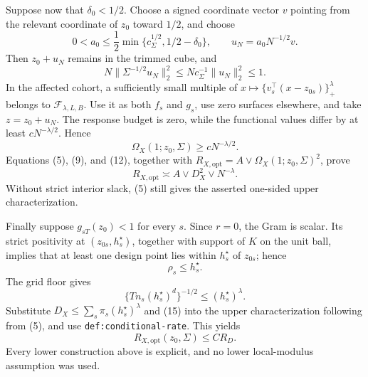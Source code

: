 Suppose now that \(\delta_0<1/2\).  Choose a signed coordinate vector \(v\) pointing from the relevant coordinate of \(z_0\) toward \(1/2\), and choose
\[
 0<a_0\le\frac12\min\{c_\Sigma^{1/2},1/2-\delta_0\},
 \qquad u_N=a_0N^{-1/2}v.                                  \tag{10}
\]
Then \(z_0+u_N\) remains in the trimmed cube, and
\[
 N\|\Sigma^{-1/2}u_N\|_2^2
 \le Nc_\Sigma^{-1}\|u_N\|_2^2\le1.                     \tag{11}
\]
In the affected cohort, a sufficiently small multiple of
\(x\mapsto\{v_s^\top(x-z_{0s})\}_+^\lambda\) belongs to
\(\mathcal F_{\lambda,L,B}\).  Use it as both \(f_s\) and \(g_s\), use zero surfaces elsewhere, and take \(z=z_0+u_N\).  The response budget is zero, while the functional values differ by at least \(cN^{-\lambda/2}\).  Hence
\[
 \Omega_X(1;z_0,\Sigma)\ge cN^{-\lambda/2}.                \tag{12}
\]
Equations (5), (9), and (12), together with
\(R_{X,\mathrm{opt}}=A\vee\Omega_X(1;z_0,\Sigma)^2\), prove
\[
 R_{X,\mathrm{opt}}\asymp A\vee D_X^2\vee N^{-\lambda}.   \tag{13}
\]
Without strict interior slack, (5) still gives the asserted one-sided upper characterization.

Finally suppose \(g_{sT}(z_0)<1\) for every \(s\).  Since \(r=0\), the Gram is scalar.  Its strict positivity at \((z_{0s},h_s^\star)\), together with support of \(K\) on the unit ball, implies that at least one design point lies within \(h_s^\star\) of \(z_{0s}\); hence
\[
 \rho_s\le h_s^\star.                                     \tag{14}
\]
The grid floor gives
\[
 \{Tn_s(h_s^\star)^d\}^{-1/2}
 \le(h_s^\star)^\lambda.                                  \tag{15}
\]
Substitute
\(D_X\le\sum_s\pi_s(h_s^\star)^\lambda\) and (15) into the upper characterization following from (5), and use \texttt{def:conditional-rate}.  This yields
\[
 R_{X,\mathrm{opt}}(z_0,\Sigma)\le CR_D.                   \tag{16}
\]
Every lower construction above is explicit, and no lower local-modulus assumption was used.

